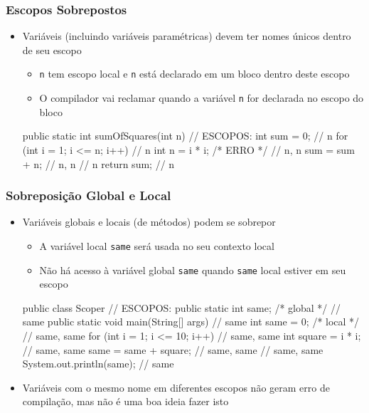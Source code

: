 \documentclass[xcolor={dvipsnames,table},aspectratio=169]{beamer}
\begin{document}
\begin{frame}[fragile]\frametitle{Escopos Sobrepostos}
\begin{itemize}
	\item Variáveis (incluindo variáveis paramétricas) devem ter nomes únicos dentro de seu escopo
	\begin{itemize}
		\item \texttt{n} tem escopo local e \texttt{n} está declarado em um bloco dentro deste escopo
		\item O compilador vai reclamar quando a variável \texttt{n} for declarada no escopo do bloco
	\end{itemize}
\begin{javacode}
public static int sumOfSquares(int n) { // ESCOPOS:
  int sum = 0;                          // n
  for (int i = 1; i <= n; i++) {        // n
    int n = i * i; /* ERRO */           // n, n
    sum = sum + n;                      // n, n
  }                                     // n
  return sum;                           // n
}
\end{javacode}
\end{itemize}
\end{frame}

\begin{frame}[fragile]\frametitle{Sobreposição Global e Local}
\begin{itemize}
	\item Variáveis globais e locais (de métodos) podem se sobrepor
	\begin{itemize}
		\item A variável local \texttt{same} será usada no seu contexto local
		\item Não há acesso à variável global \texttt{same} quando \texttt{same} local estiver em seu escopo
	\end{itemize}
{\scriptsize
\begin{javacode}
public class Scoper {                       // ESCOPOS:
  public static int same; /* global */      // same
  public static void main(String[] args) {  // same
    int same = 0; /* local */               // same, same
    for (int i = 1; i <= 10; i++) {         // same, same
      int square = i * i;                   // same, same
      same = same + square;                 // same, same
    }                                       // same, same
    System.out.println(same);               // same
  }
}
\end{javacode}
}
	\item Variáveis com o mesmo nome em diferentes escopos não geram erro de compilação, mas não é uma boa ideia fazer isto
\end{itemize}
\end{frame}
\end{document}
